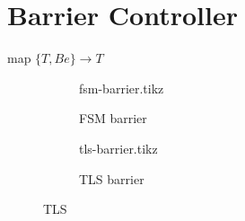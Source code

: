 \documentclass[final]{report}
\begin{document}
\section{Barrier Controller}
\label{sec:subsystems-barrier-controller}
map $\{T,Be\} \rightarrow T$
	\begin{figure}[H]
		\centering
			\begin{subfigure}[b]{0.4\textwidth}
				{fsm-barrier.tikz}
				\caption{FSM barrier}
				\label{fig:fsm-barrier}
			\end{subfigure}
			\begin{subfigure}[b]{0.4\textwidth}
				{tls-barrier.tikz}
				\caption{TLS barrier}
				\label{fig:tls-barrier}
			\end{subfigure}
		\caption{TLS}
		\label{fig:barrier}
	\end{figure}
\end{document}

